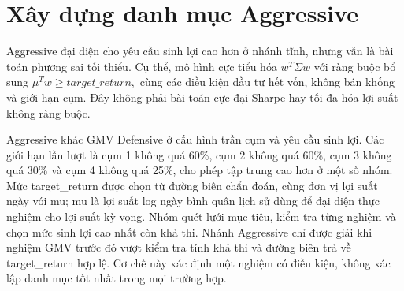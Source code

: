 \documentclass[12pt,a4paper,openany,oneside]{book}
\begin{document}
\section{Xây dựng danh mục Aggressive}\label{Toc227188444}
Aggressive đại diện cho yêu cầu sinh lợi cao hơn ở nhánh tĩnh, nhưng vẫn là bài toán phương sai tối thiểu. Cụ thể, mô hình cực tiểu hóa \({w}^{T}\Sigma w\) với ràng buộc bổ sung \({\mu}^{T}w\geq target\_return,\) cùng các điều kiện đầu tư hết vốn, không bán khống và giới hạn cụm. Đây không phải bài toán cực đại Sharpe hay tối đa hóa lợi suất không ràng buộc.

Aggressive khác GMV Defensive ở cấu hình trần cụm và yêu cầu sinh lợi. Các giới hạn lần lượt là cụm 1 không quá 60\%, cụm 2 không quá 60\%, cụm 3 không quá 30\% và cụm 4 không quá 25\%, cho phép tập trung cao hơn ở một số nhóm. Mức target\_return được chọn từ đường biên chẩn đoán, cùng đơn vị lợi suất ngày với mu; mu là lợi suất log ngày bình quân lịch sử dùng để đại diện thực nghiệm cho lợi suất kỳ vọng. Nhóm quét lưới mục tiêu, kiểm tra từng nghiệm và chọn mức sinh lợi cao nhất còn khả thi. Nhánh Aggressive chỉ được giải khi nghiệm GMV trước đó vượt kiểm tra tính khả thi và đường biên trả về target\_return hợp lệ. Cơ chế này xác định một nghiệm có điều kiện, không xác lập danh mục tốt nhất trong mọi trường hợp.
\end{document}
